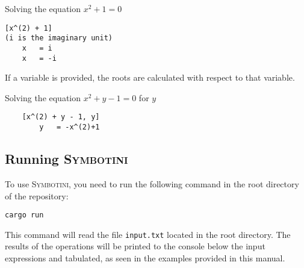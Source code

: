 \begin{exmp}
    {Solving the equation $x^2 + 1 = 0$}
    \begin{verbatim}
[x^(2) + 1]
(i is the imaginary unit)
    x   = i
    x   = -i
    \end{verbatim}
\end{exmp}

If a variable is provided, the roots are calculated with respect to that variable.

\begin{exmp}
    {Solving the equation $x^2 + y - 1 = 0$ for $y$}
    \begin{verbatim}
    [x^(2) + y - 1, y]
        y   = -x^(2)+1
    \end{verbatim}
\end{exmp}

\subsection{Running \textsc{Symbotini}}

To use \textsc{Symbotini}, you need to run the following command in the root directory of the repository:

\begin{verbatim}
cargo run
\end{verbatim}

This command will read the file \texttt{input.txt} located in the root directory.
The results of the operations will be printed to the console below the input expressions and tabulated, as seen in the examples provided in this manual.

